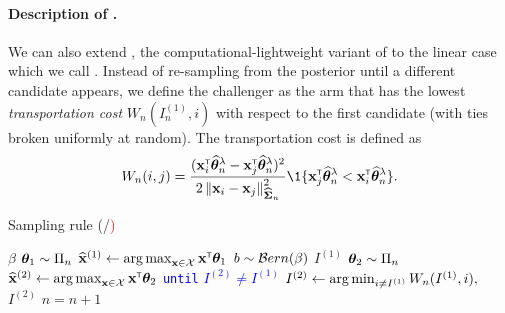 \paragraph{Description of \LTCC{}.} We can also extend \TCC{}, the computational-lightweight variant of \TTTS{} to the linear case which we call \LTCC{}. Instead of re-sampling from the posterior until a different candidate appears, we define the challenger as the arm that has the lowest \emph{transportation cost} $W_n(I_n^{(1)},i)$ with respect to the first candidate (with ties broken uniformly at random). The transportation cost is defined as
\begin{align}\label{def:transportation}
    W_n(i,j) = \dfrac{(\bx_i\transpose\hat{\btheta}^\lambda_n-\bx_j\transpose\hat{\btheta}^\lambda_n)^2}{2\normm{\bx_i-\bx_j}_{\hat{\bSigma}_n}^2}\1\{\bx_j\transpose\hat{\btheta}^\lambda_n<\bx_i\transpose\hat{\btheta}^\lambda_n\}.
\end{align}

\begin{algorithm}[ht]
\centering
\caption{Sampling rule (\textcolor{blue}{\LTCS{}}/\textcolor{red}{\LTCC{})}}
\label{alg:sampling_rule}
\begin{algorithmic}[1]
    $\beta$ %
        \State {} ${\boldsymbol \theta}_1 \sim \Pi_n$
        \State $\widehat{{\bf x}}^{(1)} \leftarrow \operatorname*{arg\,max}_{{\bf x}\in\mathcal{X}} {\bf x}^\mathsf{\scriptscriptstyle T}{\boldsymbol \theta}_1$ 
	    \State {} $b \sim \mathcal{B} ern(\beta)$
	        \State {} $I^{(1)}$
	    \Else
	        \State \textcolor{blue}{ ${\boldsymbol \theta}_2 \sim \Pi_n$}%
            \State \textcolor{blue}{$\widehat{{\bf x}}^{(2)} \leftarrow \operatorname*{arg\,max}_{{\bf x}\in\mathcal{X}} {\bf x}^\mathsf{\scriptscriptstyle T}{\boldsymbol \theta}_2$ }\Comment{\textcolor{blue}{\LTCS}}
	        \State \textcolor{blue}{\texttt{until} $I^{(2)} \neq I^{(1)}$}%
	        \State \textcolor{red}{$I^{(2)} \leftarrow \operatorname*{arg\,min}_{i\neq I^{(1)}}W_n(I^{(1)},i), $ }\Comment{\textcolor{red}{\LTCC}}%
		    \State {} $I^{(2)}$
	    \EndIf
	    \State {}
	    \State $n = n+1$
   \EndFor
\end{algorithmic}
\end{algorithm}

